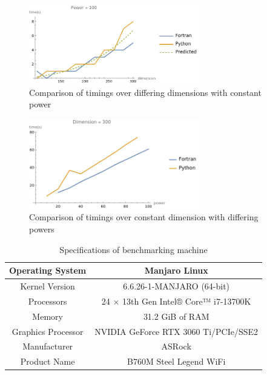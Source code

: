 \documentclass{article}
\begin{document}
    \begin{figure}[h]
        \centering
        \includegraphics[width=0.66\textwidth]{images/dimension.png}
        \caption{Comparison of timings over differing dimensions with constant power}
        \label{fig:dimension}
    \end{figure}

    \begin{figure}[h]
        \centering
        \includegraphics[width=0.66\textwidth]{images/power.png}
        \caption{Comparison of timings over constant dimension with differing powers}
        \label{fig:power}
    \end{figure}

    \begin{table}[h]
        \centering
        \begin{tabular}{|c|c|}
            \hline
            Operating System & Manjaro Linux \\
            \hline
            Kernel Version & 6.6.26-1-MANJARO (64-bit) \\
            \hline
            Processors & 24 × 13th Gen Intel® Core™ i7-13700K \\
            \hline
            Memory & 31.2 GiB of RAM \\
            \hline
            Graphics Processor & NVIDIA GeForce RTX 3060 Ti/PCIe/SSE2 \\
            \hline
            Manufacturer & ASRock \\
            \hline
            Product Name & B760M Steel Legend WiFi \\
            \hline
        \end{tabular}
        \caption{Specifications of benchmarking machine}
        \label{tbl:specs}
    \end{table}
\end{document}

